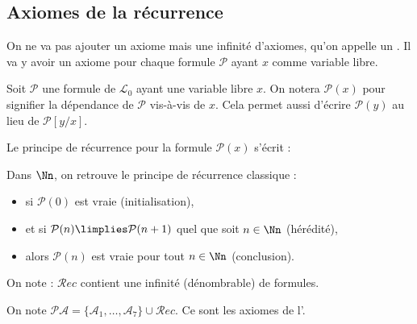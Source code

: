 \documentclass[11pt,class=report,crop=false]{standalone}
\begin{document}
\subsection{Axiomes de la récurrence}

On ne va pas ajouter un axiome mais une infinité d'axiomes, qu'on appelle un . Il va y avoir un axiome pour chaque formule $\mathcal{P}$ ayant $x$ comme variable libre.

Soit $\mathcal{P}$ une formule de $\mathcal{L}_0$ ayant une variable libre $x$. On notera $\mathcal{P}(x)$ pour signifier la dépendance de $\mathcal{P}$ vis-à-vis de $x$. Cela permet aussi d'écrire $\mathcal{P}(y)$ au lieu de $\mathcal{P}[y/x]$.

Le principe de récurrence pour la formule $\mathcal{P}(x)$ s'écrit :

Dans $\Nn$, on retrouve le principe de récurrence classique :
\begin{itemize}
	\item si $\mathcal{P}(0)$ est vraie (initialisation),
	\item et si $\mathcal{P}(n) \limplies \mathcal{P}(n+1)$ quel que soit $n \in \Nn$ (hérédité),
	\item alors $\mathcal{P}(n)$ est vraie pour tout $n \in \Nn$ (conclusion).
\end{itemize}

On note :
$\mathcal{R}ec$ contient une infinité (dénombrable) de formules.

\medskip

\begin{definition}
On note $\mathcal{PA} = \{\mathcal{A}_1, \ldots, \mathcal{A}_7\} \cup \mathcal{R}ec$. 
Ce sont les axiomes de l'.
\end{definition}
\end{document}
